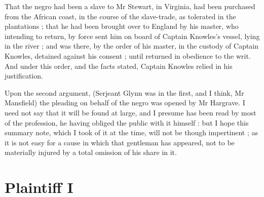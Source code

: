 \documentclass[a4paper]{article}
\begin{document}
That the negro had been a slave to Mr Stewart, in Virginia, had been purchased from the African coast, in the course of the slave-trade, as tolerated in the plantations ; that he had been brought over to England by his master, who intending to return, by force sent him on board of Captain Knowles's vessel, lying in the river ; and was there, by the order of his master, in the custody of Captain Knowles, detained against his consent ; until returned in obedience to the writ. And under this order, and the facts stated, Captain Knowles relied in his justification.

Upon the second argument, (Serjeant Glynn was in the first, and I think, Mr Mansfield) the pleading on behalf of the negro was opened by Mr Hargrave. I need not say that it will be found at large, and I presume has been read by most of the profession, he having obliged the public with it himself : but I hope this summary note, which I took of it at the time, will not be though impertinent ; as it is not easy for a cause in which that gentleman has appeared, not to be materially injured by a total omission of his share in it.

\section{Plaintiff I}
\end{document}
